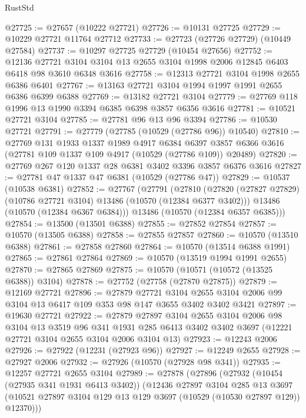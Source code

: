 \begin{lexlean}{RustStd}
\begin{coremodule}
@27725 := @27657 (@10222 @27721)
@27726 := @10131 @27725
@27729 := @10229 @27721 @11764 @27712
@27733 := @27723 (@27726 @27729) (@10449 @27584)
@27737 := @10297 @27725 @27729 (@10454 @27656)
@27752 := @12136
    @27721
    @3104
    @3104
    @13
    @2655
    @3104
    @1998
    @2006
    @12845
    @6403
    @6418
    @98
    @3610
    @6348
    @3616
@27758 := @12313 @27721 @3104 @1998 @2655 @6386 @6401
@27767 := @13163 @27721 @3104 @1994 @1997 @1991 @2655 @6386 @6399 @6388
@27769 := @13182 @27721 @3104
@27779 := @27769 @118 @1996 @13 @1990 @3394 @6385 @6398 @3857 @6356 @3616
@27781 := @10521 @27721 @3104
@27785 := @27781 @96 @13 @96 @3394
@27786 := @10530 @27721
@27791 := @27779 (@27785 (@10529 (@27786 @96)) @10540)
@27810 := @27769
    @131
    @1933
    @1337
    @1989
    @4917
    @6384
    @6397
    @3857
    @6366
    @3616
    (@27781 @109 @1337 @109 @4917 (@10529 (@27786 @109)) @20489)
@27820 := @27769 @267 @120 @1337 @28 @6381 @3402 @3396 @3857 @6376 @3616
@27827 := @27781 @47 @1337 @47 @6381 (@10529 (@27786 @47))
@27829 := @10537 (@10538 @6381)
@27852 := @27767
    (@27791
      (@27810
        (@27820 (@27827 @27829) (@10786 @27721 @3104) @13486 (@10570 (@12384 @6377 @3402)))
        @13486
        (@10570 (@12384 @6367 @6384)))
      @13486
      (@10570 (@12384 @6357 @6385)))
@27854 := @13500 (@13501 @6388)
@27855 := @27852 @27854
@27857 := @10570 (@13505 @6388)
@27858 := @27855 @27857
@27860 := @10570 (@13510 @6388)
@27861 := @27858 @27860
@27864 := @10570 (@13514 @6388 @1991)
@27865 := @27861 @27864
@27869 := @10570 (@13519 @1994 @1991 @2655)
@27870 := @27865 @27869
@27875 := @10570 (@10571 (@10572 (@13525 @6388)) @3104)
@27878 := @27752 (@27758 (@27870 @27875))
@27879 := @12169 @27721
@27896 := @27879
    @27721
    @3104
    @2655
    @3104
    @2006
    @99
    @3104
    @13
    @6417
    @109
    @353
    @98
    @147
    @3655
    @3402
    @3402
    @3421
@27897 := @19630 @27721
@27922 := @27879
    @27897
    @3104
    @2655
    @3104
    @2006
    @98
    @3104
    @13
    @3519
    @96
    @341
    @1931
    @285
    @6413
    @3402
    @3402
    @3697
    (@12221 @27721 @3104 @2655 @3104 @2006 @3104 @13)
@27923 := @12243 @2006
@27926 := @27922 (@12231 (@27923 @96))
@27927 := @12249 @2655
@27928 := @27927 @2006
@27932 := @27926 (@10570 (@27928 @98 @341))
@27935 := @12257 @27721 @2655 @3104
@27989 := @27878
    (@27896
      (@27932
        (@10454 (@27935 @341 @1931 @6413 @3402))
        (@12436
          @27897
          @3104
          @285
          @13
          @3697
          (@10521 @27897 @3104 @129 @13 @129 @3697 (@10529 (@10530 @27897 @129)) @12370)))

\end{coremodule}
\end{lexlean}
